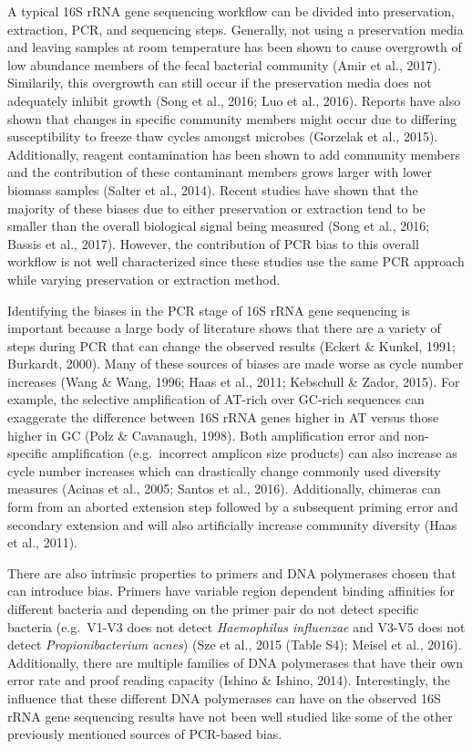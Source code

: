 \documentclass[12pt,]{article}
\begin{document}
A typical 16S rRNA gene sequencing workflow can be divided into
preservation, extraction, PCR, and sequencing steps. Generally, not
using a preservation media and leaving samples at room temperature has
been shown to cause overgrowth of low abundance members of the fecal
bacterial community (Amir et al., 2017). Similarily, this overgrowth can
still occur if the preservation media does not adequately inhibit growth
(Song et al., 2016; Luo et al., 2016). Reports have also shown that
changes in specific community members might occur due to differing
susceptibility to freeze thaw cycles amongst microbes (Gorzelak et al.,
2015). Additionally, reagent contamination has been shown to add
community members and the contribution of these contaminant members
grows larger with lower biomass samples (Salter et al., 2014). Recent
studies have shown that the majority of these biases due to either
preservation or extraction tend to be smaller than the overall
biological signal being measured (Song et al., 2016; Bassis et al.,
2017). However, the contribution of PCR bias to this overall workflow is
not well characterized since these studies use the same PCR approach
while varying preservation or extraction method.

Identifying the biases in the PCR stage of 16S rRNA gene sequencing is
important because a large body of literature shows that there are a
variety of steps during PCR that can change the observed results (Eckert
\& Kunkel, 1991; Burkardt, 2000). Many of these sources of biases are
made worse as cycle number increases (Wang \& Wang, 1996; Haas et al.,
2011; Kebschull \& Zador, 2015). For example, the selective
amplification of AT-rich over GC-rich sequences can exaggerate the
difference between 16S rRNA genes higher in AT versus those higher in GC
(Polz \& Cavanaugh, 1998). Both amplification error and non-specific
amplification (e.g.~incorrect amplicon size products) can also increase
as cycle number increases which can drastically change commonly used
diversity measures (Acinas et al., 2005; Santos et al., 2016).
Additionally, chimeras can form from an aborted extension step followed
by a subsequent priming error and secondary extension and will also
artificially increase community diversity (Haas et al., 2011).

There are also intrinsic properties to primers and DNA polymerases
chosen that can introduce bias. Primers have variable region dependent
binding affinities for different bacteria and depending on the primer
pair do not detect specific bacteria (e.g.~V1-V3 does not detect
\emph{Haemophilus influenzae} and V3-V5 does not detect
\emph{Propionibacterium acnes}) (Sze et al., 2015 (Table S4); Meisel et
al., 2016). Additionally, there are multiple families of DNA polymerases
that have their own error rate and proof reading capacity (Ishino \&
Ishino, 2014). Interestingly, the influence that these different DNA
polymerases can have on the observed 16S rRNA gene sequencing results
have not been well studied like some of the other previously mentioned
sources of PCR-based bias.
\end{document}
